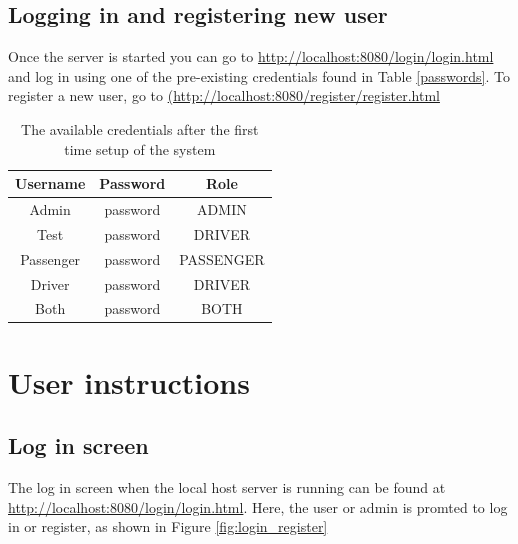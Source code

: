 \documentclass{article}
\begin{document}
\subsection{Logging in and registering new user}
Once the server is started you can go to \url{http://localhost:8080/login/login.html} and log in using one of the pre-existing credentials found in Table \ref{passwords}. To register a new user, go to \url{(http://localhost:8080/register/register.html}

\begin{table}[h!]\label{passwords}
    \centering
    \begin{tabular}{|c|c|c|}
        \hline
         Username & Password & Role \\\hline\hline
         Admin & password & ADMIN \\\hline
         Test & password & DRIVER \\\hline
         Passenger & password & PASSENGER \\\hline
        Driver & password & DRIVER \\\hline
        Both & password & BOTH\\\hline
    \end{tabular}
    \caption{The available credentials after the first time setup of the system}
    \label{tab:my_label}
\end{table}

\clearpage
\newpage
\section{User instructions}
\subsection{Log in screen}
The log in screen when the local host server is running can be found at \url{http://localhost:8080/login/login.html}. Here, the user or admin is promted to log in or register, as shown in Figure \ref{fig:login_register}
\end{document}
